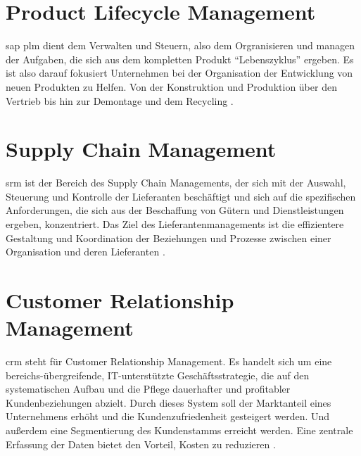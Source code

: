 \section{Product Lifecycle Management}
\label{sec:plm-definition}
\gls{sap} \gls{plm} dient dem Verwalten und Steuern, also dem Orgranisieren und managen der Aufgaben, die sich aus dem kompletten Produkt "`Lebenszyklus"' ergeben. Es ist also darauf fokusiert Unternehmen bei der Organisation der Entwicklung von neuen Produkten zu Helfen. Von der Konstruktion und Produktion über den Vertrieb bis hin zur Demontage und dem Recycling \cite{PLMDefinition}.

\section{Supply Chain Management}
\label{sec:srm-definition}
\gls{srm} ist der Bereich des Supply Chain Managements, der sich mit der Auswahl, Steuerung und Kontrolle der Lieferanten beschäftigt und sich auf die spezifischen Anforderungen, die sich aus der Beschaffung von Gütern und Dienstleistungen ergeben, konzentriert. Das Ziel des Lieferantenmanagements ist die effizientere Gestaltung und Koordination der Beziehungen und Prozesse zwischen einer Organisation und deren Lieferanten \cite{SRMDefinition}.

\section{Customer Relationship Management}
\label{sec:crm-definition}
\gls{crm} steht für Customer Relationship Management. Es handelt sich um eine bereichs-übergreifende, IT-unterstützte Geschäftsstrategie, die auf den systematischen Aufbau und die Pflege dauerhafter und profitabler Kundenbeziehungen abzielt. Durch dieses System soll der Marktanteil eines Unternehmens erhöht und die Kundenzufriedenheit gesteigert werden. Und außerdem eine Segmentierung des Kundenstamms erreicht werden. Eine zentrale Erfassung der Daten bietet den Vorteil, Kosten zu reduzieren \cite{ERPDefinition}.

